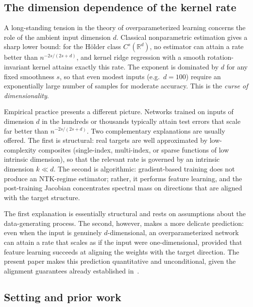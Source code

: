 \documentclass[12pt]{amsart}
\theoremstyle{definition}
\theoremstyle{remark}
\newcommand{\R}{\mathbb{R}}
\begin{document}
\subsection{The dimension dependence of the kernel rate}

A long-standing tension in the theory of overparameterized learning concerns
the role of the ambient input dimension $d$. Classical nonparametric
estimation gives a sharp lower bound: for the H\"older class
$C^{s}(\R^{d})$, no estimator can attain a rate better than
$n^{-2s/(2s+d)}$, and kernel ridge regression with a smooth rotation-invariant
kernel attains exactly this rate. The exponent is dominated by $d$ for any
fixed smoothness $s$, so that even modest inputs (e.g.\ $d=100$) require an
exponentially large number of samples for moderate accuracy. This is the
\emph{curse of dimensionality}.

Empirical practice presents a different picture. Networks trained on inputs
of dimension $d$ in the hundreds or thousands typically attain test errors
that scale far better than $n^{-2s/(2s+d)}$. Two complementary explanations
are usually offered. The first is structural: real targets are well
approximated by low-complexity composites (single-index, multi-index, or
sparse functions of low intrinsic dimension), so that the relevant rate is
governed by an intrinsic dimension $k \ll d$. The second is algorithmic:
gradient-based training does not produce an NTK-regime estimator; rather, it
performs feature learning, and the post-training Jacobian concentrates
spectral mass on directions that are aligned with the target structure.

The first explanation is essentially structural and rests on assumptions about
the data-generating process. The second, however, makes a more delicate
prediction: even when the input is genuinely $d$-dimensional, an
overparameterized network can attain a rate that scales as if the input were
one-dimensional, provided that feature learning succeeds at aligning the
weights with the target direction. The present paper makes this prediction
quantitative and unconditional, given the alignment guarantees already
established in~\cite{paperB}.

\subsection{Setting and prior work}
\end{document}
